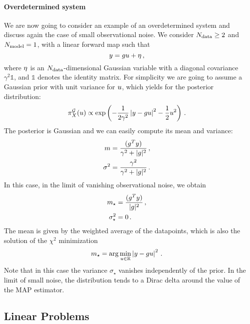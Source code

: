 \paragraph{Overdetermined system}
We are now going to consider an example of an overdetermined system and discuss
again the case of small observational noise. We consider $N_{\rm data}\geq 2$ and
$N_{\rm model}=1$, with a linear forward map such that
\begin{equation}
 \label{eq:OverDetForwMap}
 y = g u  + \eta\, ,
\end{equation} 
where $\eta$ is an $N_{\rm data}$-dimensional Gaussian variable with a diagonal
covariance $\gamma^2 \mathbb{1}$, and $\mathbb{1}$ denotes the identity matrix.
For simplicity we are going to assume a Gaussian prior with unit variance for
$u$, which yields for the posterior distribution:
\begin{equation}
  \label{eq:OverDetPost}
  \pi_{X}^{\mathcal{G}}(u) 
    \propto 
    \exp\left(
      -\frac{1}{2\gamma^2} \left| y - g u \right|^2
      -\frac12 u^2
    \right)\, .
\end{equation} 
The posterior is Gaussian and we can easily compute its mean and variance: 
\begin{align}
  m &= \frac{(g^T y)}{\gamma^2 + |g|^2} \, , \\
  \sigma^2 &=
    \frac{\gamma^2}{\gamma^2 + |g|^2}\, .
\end{align}
In this case, in the limit of vanishing observational noise, we obtain
\begin{align}
  m_\star &= \frac{(g^T y)}{|g|^2} \, ,\\
  \sigma_\star^2 &= 0\, .
\end{align}
The mean is given by the weighted average of the datapoints, which is also the
solution of the $\chi^2$ minimization
\begin{equation}
  m_\star = \arg\min_{u\in\mathbb{R}} \left|y - g u\right|^2\, .
\end{equation}
Note that in this case the variance $\sigma_\star$ vanishes independently of the
prior. In the limit of small noise, the distribution tends to a Dirac delta
around the value of the MAP estimator.  

\subsection{Linear Problems}
\label{sec:LinProbs}

